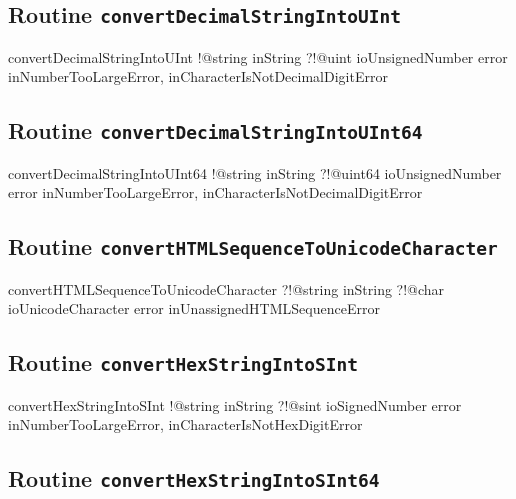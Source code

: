 {\subsection{Routine \texttt{convertDecimalStringIntoUInt}}

\begin{galgascode}
convertDecimalStringIntoUInt !@string inString
                             ?!@uint ioUnsignedNumber
                             error inNumberTooLargeError,
                                   inCharacterIsNotDecimalDigitError
\end{galgascode}

\subsection{Routine \texttt{convertDecimalStringIntoUInt64}}

\begin{galgascode}
convertDecimalStringIntoUInt64 !@string inString
                               ?!@uint64 ioUnsignedNumber
                               error inNumberTooLargeError,
                                     inCharacterIsNotDecimalDigitError
\end{galgascode}

\subsection{Routine \texttt{convertHTMLSequenceToUnicodeCharacter}}

\begin{galgascode}
convertHTMLSequenceToUnicodeCharacter ?!@string inString
                                      ?!@char ioUnicodeCharacter
                                      error inUnassignedHTMLSequenceError
\end{galgascode}

\subsection{Routine \texttt{convertHexStringIntoSInt}}

\begin{galgascode}
convertHexStringIntoSInt !@string inString
                         ?!@sint ioSignedNumber
                         error inNumberTooLargeError,
                               inCharacterIsNotHexDigitError
\end{galgascode}

\subsection{Routine \texttt{convertHexStringIntoSInt64}}

}
